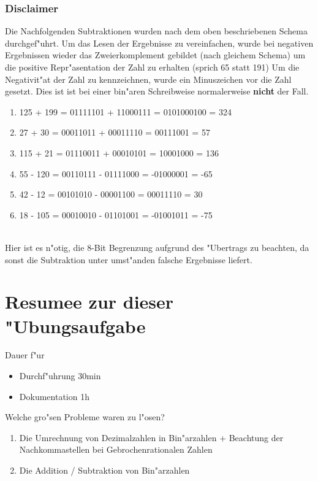 \documentclass[a4paper,11pt,titlepage]{article}
\begin{document}
    \subsubsection*{Disclaimer}
    Die Nachfolgenden Subtraktionen wurden nach dem oben beschriebenen Schema durchgef"uhrt. Um das Lesen der Ergebnisse zu vereinfachen, wurde bei negativen Ergebnissen wieder das Zweierkomplement gebildet (nach gleichem Schema) um die positive Repr"asentation der Zahl zu erhalten (sprich 65 statt 191)
    Um die Negativit"at der Zahl zu kennzeichnen, wurde ein Minuszeichen vor die Zahl gesetzt. Dies ist ist bei einer bin"aren Schreibweise normalerweise \textbf{nicht} der Fall.
    \begin{enumerate}
        \item 125 + 199 = 01111101 + 11000111 = 0101000100 = 324
        \item 27 + 30 = 00011011 + 00011110 = 00111001 = 57
        \item 115 + 21 = 01110011 + 00010101 = 10001000 = 136
        \item 55 - 120 = 00110111 - 01111000 = -01000001 = -65
        \item 42 - 12 = 00101010 - 00001100 = 00011110 = 30
        \item 18 - 105 = 00010010 - 01101001 = -01001011 = -75
    \end{enumerate}
    \\


    Hier ist es n"otig, die 8-Bit Begrenzung aufgrund des "Ubertrags zu beachten, da sonst die Subtraktion unter umst"anden falsche Ergebnisse liefert.



    \section{Resumee zur dieser "Ubungsaufgabe}
    Dauer f"ur
    \begin{itemize}
        \item Durchf"uhrung 30min
        \item Dokumentation 1h
    \end{itemize}
    Welche gro"sen Probleme waren zu l"osen?
    \begin{enumerate}
        \item Die Umrechnung von Dezimalzahlen in Bin"arzahlen + Beachtung der Nachkommastellen bei Gebrochenrationalen Zahlen
        \item Die Addition / Subtraktion von Bin"arzahlen
    \end{enumerate}
\end{document}
